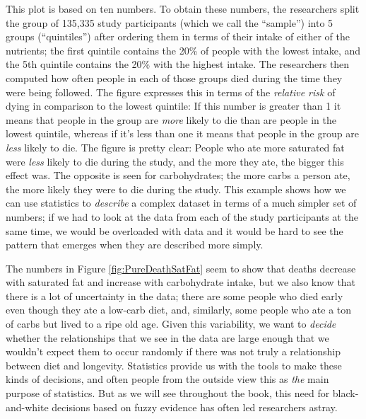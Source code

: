\documentclass[]{book}
\theoremstyle{definition}
\theoremstyle{definition}
\theoremstyle{definition}
\theoremstyle{remark}
\begin{document}
This plot is based on ten numbers. To obtain these numbers, the
researchers split the group of 135,335 study participants (which we call
the ``sample'') into 5 groups (``quintiles'') after ordering them in
terms of their intake of either of the nutrients; the first quintile
contains the 20\% of people with the lowest intake, and the 5th quintile
contains the 20\% with the highest intake. The researchers then computed
how often people in each of those groups died during the time they were
being followed. The figure expresses this in terms of the \emph{relative
risk} of dying in comparison to the lowest quintile: If this number is
greater than 1 it means that people in the group are \emph{more} likely
to die than are people in the lowest quintile, whereas if it's less than
one it means that people in the group are \emph{less} likely to die. The
figure is pretty clear: People who ate more saturated fat were
\emph{less} likely to die during the study, and the more they ate, the
bigger this effect was. The opposite is seen for carbohydrates; the more
carbs a person ate, the more likely they were to die during the study.
This example shows how we can use statistics to \emph{describe} a
complex dataset in terms of a much simpler set of numbers; if we had to
look at the data from each of the study participants at the same time,
we would be overloaded with data and it would be hard to see the pattern
that emerges when they are described more simply.

The numbers in Figure \ref{fig:PureDeathSatFat} seem to show that deaths
decrease with saturated fat and increase with carbohydrate intake, but
we also know that there is a lot of uncertainty in the data; there are
some people who died early even though they ate a low-carb diet, and,
similarly, some people who ate a ton of carbs but lived to a ripe old
age. Given this variability, we want to \emph{decide} whether the
relationships that we see in the data are large enough that we wouldn't
expect them to occur randomly if there was not truly a relationship
between diet and longevity. Statistics provide us with the tools to make
these kinds of decisions, and often people from the outside view this as
\emph{the} main purpose of statistics. But as we will see throughout the
book, this need for black-and-white decisions based on fuzzy evidence
has often led researchers astray.
\end{document}
